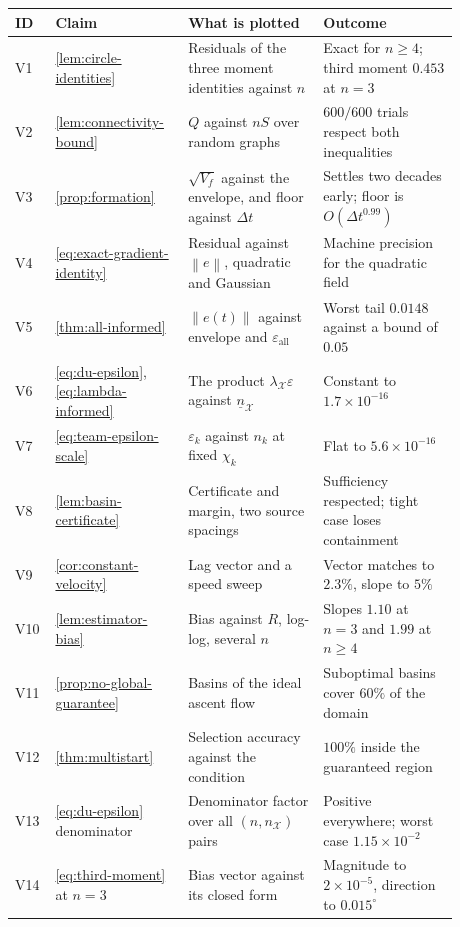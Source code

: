 \documentclass[11pt]{article}
\newcommand{\norm}[1]{\left\lVert #1\right\rVert}
\begin{document}
\begin{center}
\begin{tabular}{p{0.05\linewidth}p{0.26\linewidth}p{0.28\linewidth}p{0.29\linewidth}}
\hline
ID & Claim & What is plotted & Outcome \\
\hline
V1 & \cref{lem:circle-identities} & Residuals of the three moment identities against $n$ & Exact for $n\geq4$; third moment $0.453$ at $n=3$ \\
V2 & \cref{lem:connectivity-bound} & $Q$ against $nS$ over random graphs & $600/600$ trials respect both inequalities \\
V3 & \cref{prop:formation} & $\sqrt{V_f}$ against the envelope, and floor against $\Delta t$ & Settles two decades early; floor is $O(\Delta t^{0.99})$ \\
V4 & \eqref{eq:exact-gradient-identity} & Residual against $\norm e$, quadratic and Gaussian & Machine precision for the quadratic field \\
V5 & \cref{thm:all-informed} & $\norm{e(t)}$ against envelope and $\varepsilon_{\mathrm{all}}$ & Worst tail $0.0148$ against a bound of $0.05$ \\
V6 & \eqref{eq:du-epsilon}, \eqref{eq:lambda-informed} & The product $\lambda_{\mathcal X}\varepsilon$ against $\underline n_{\mathcal X}$ & Constant to $1.7\times10^{-16}$ \\
V7 & \eqref{eq:team-epsilon-scale} & $\varepsilon_k$ against $n_k$ at fixed $\chi_k$ & Flat to $5.6\times10^{-16}$ \\
V8 & \cref{lem:basin-certificate} & Certificate and margin, two source spacings & Sufficiency respected; tight case loses containment \\
V9 & \cref{cor:constant-velocity} & Lag vector and a speed sweep & Vector matches to $2.3\%$, slope to $5\%$ \\
V10 & \cref{lem:estimator-bias} & Bias against $R$, log-log, several $n$ & Slopes $1.10$ at $n=3$ and $1.99$ at $n\geq4$ \\
V11 & \cref{prop:no-global-guarantee} & Basins of the ideal ascent flow & Suboptimal basins cover $60\%$ of the domain \\
V12 & \cref{thm:multistart} & Selection accuracy against the condition & $100\%$ inside the guaranteed region \\
V13 & \eqref{eq:du-epsilon} denominator & Denominator factor over all $(n,n_{\mathcal X})$ pairs & Positive everywhere; worst case $1.15\times10^{-2}$ \\
V14 & \eqref{eq:third-moment} at $n=3$ & Bias vector against its closed form & Magnitude to $2\times10^{-5}$, direction to $0.015^\circ$ \\
\hline
\end{tabular}
\end{center}
\end{document}
